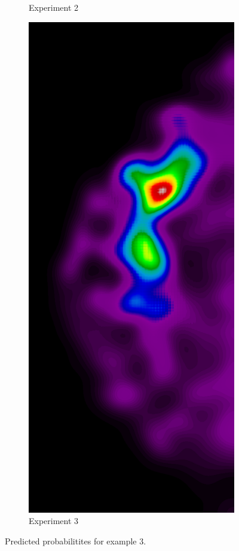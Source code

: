 \begin{figure}[h!]
\begin{subfigure}{0.195\textwidth}
		\caption{Experiment 2}
    \end{subfigure}
    \begin{subfigure}{0.195\textwidth}
		\centering
			\includegraphics[width=\textwidth]{plots/examples/example3_probs_3.png}
		\caption{Experiment 3}
    \end{subfigure}
	\caption[Predictions for example 3]{Predicted probabilitites for example 3.}
\end{figure}

